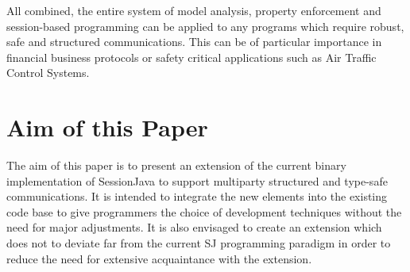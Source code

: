 All combined, the entire system of model analysis, property enforcement and session-based programming can be applied to any programs which require robust, safe and structured communications. This can be of particular importance in financial business protocols or safety critical applications such as Air Traffic Control Systems.

\section{Aim of this Paper}

The aim of this paper is to present an extension of the current binary implementation of SessionJava to support multiparty structured and type-safe communications. It is intended to integrate the new elements into the existing code base to give programmers the choice of development techniques without the need for major adjustments. It is also envisaged to create an extension which does not to deviate far from the current SJ programming paradigm in order to reduce the need for extensive acquaintance with the extension.   